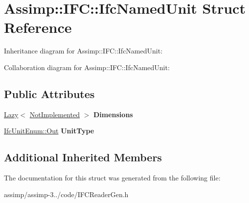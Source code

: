 \hypertarget{struct_assimp_1_1_i_f_c_1_1_ifc_named_unit}{\section{Assimp\+:\+:I\+F\+C\+:\+:Ifc\+Named\+Unit Struct Reference}
\label{struct_assimp_1_1_i_f_c_1_1_ifc_named_unit}
}


Inheritance diagram for Assimp\+:\+:I\+F\+C\+:\+:Ifc\+Named\+Unit\+:


Collaboration diagram for Assimp\+:\+:I\+F\+C\+:\+:Ifc\+Named\+Unit\+:
\subsection*{Public Attributes}
\begin{DoxyCompactItemize}
\item 
\hypertarget{struct_assimp_1_1_i_f_c_1_1_ifc_named_unit_a492799332ad1f18487dc211dae642532}{\hyperlink{struct_assimp_1_1_s_t_e_p_1_1_lazy}{Lazy}$<$ \hyperlink{struct_assimp_1_1_i_f_c_1_1_not_implemented}{Not\+Implemented} $>$ {\bfseries Dimensions}}\label{struct_assimp_1_1_i_f_c_1_1_ifc_named_unit_a492799332ad1f18487dc211dae642532}

\item 
\hypertarget{struct_assimp_1_1_i_f_c_1_1_ifc_named_unit_a8a746982b651e06b8a011a59052623c1}{\hyperlink{classboost_1_1shared__ptr}{Ifc\+Unit\+Enum\+::\+Out} {\bfseries Unit\+Type}}\label{struct_assimp_1_1_i_f_c_1_1_ifc_named_unit_a8a746982b651e06b8a011a59052623c1}

\end{DoxyCompactItemize}
\subsection*{Additional Inherited Members}


The documentation for this struct was generated from the following file\+:\begin{DoxyCompactItemize}
\item 
assimp/assimp-\/3../code/I\+F\+C\+Reader\+Gen.\+h\end{DoxyCompactItemize}
